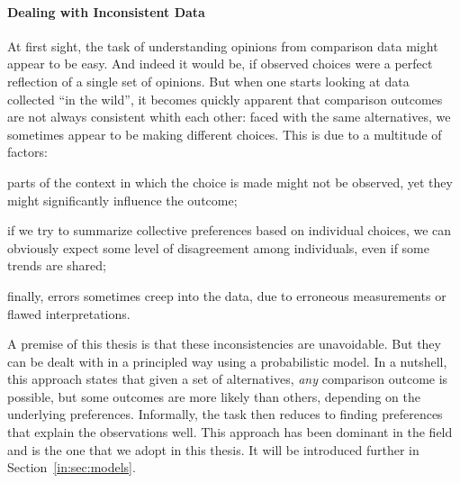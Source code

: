 \paragraph{Dealing with Inconsistent Data}
At first sight, the task of understanding opinions from comparison data might appear to be easy.
And indeed it would be, if observed choices were a perfect reflection of a single set of opinions.
But when one starts looking at data collected ``in the wild'', it becomes quickly apparent that comparison outcomes are not always consistent whith each other:
faced with the same alternatives, we sometimes appear to be making different choices.
This is due to a multitude of factors:
\begin{enuminline}
\item parts of the context in which the choice is made might not be observed, yet they might significantly influence the outcome;
\item if we try to summarize collective preferences based on individual choices, we can obviously expect some level of disagreement among individuals, even if some trends are shared;
\item finally, errors sometimes creep into the data, due to erroneous measurements or flawed interpretations.
\end{enuminline}
A premise of this thesis is that these inconsistencies are unavoidable.
But they can be dealt with in a principled way using a probabilistic model.
In a nutshell, this approach states that given a set of alternatives, \emph{any} comparison outcome is possible, but some outcomes are more likely than others, depending on the underlying preferences.
Informally, the task then reduces to finding preferences that explain the observations well.
This approach has been dominant in the field and is the one that we adopt in this thesis.
It will be introduced further in Section~\ref{in:sec:models}.

